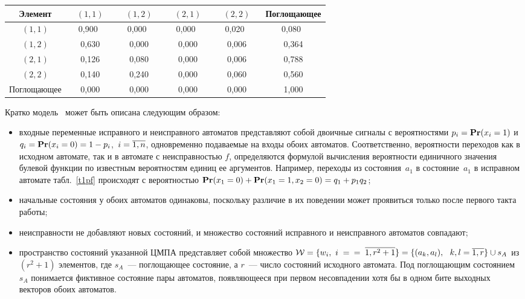 \begin{multicols}{2}
\begin{table*}[b]\small %
\begin{center}
\vspace*{2ex}

\begin{tabular}{|c||c|c|c|c|c|}
\hline
Элемент& $(1,1)$ & $(1,2)$ & $(2,1)$ & $(2,2)$ & Поглощающее \\
\hline
$(1,1)$ &\ \ 0,900\ \ \ &\ \ 0,000\ \ \ &\ \ 0,000\ \ \ &\ \ 0,020\ \ \ &\ \
0,080\ \ \ \\
$(1,2)$ & 0,630 & 0,000 & 0,000 & 0,006 & 0,364 \\
$(2,1)$ & 0,126 & 0,080 & 0,000 & 0,006 & 0,788 \\
$(2,2)$ & 0,140 & 0,240 & 0,000 & 0,060 & 0,560 \\
Поглощающее & 0,000 & 0,000 & 0,000 & 0,000 & 1,000 \\
\hline
\end{tabular}
\end{center}
\end{table*}

Кратко модель~\cite{4} может быть описана сле\-ду\-ющим образом:
\begin{itemize}
\item
 входные переменные исправного и неисправного автоматов представляют
собой двоичные сигналы с вероятностями
$p_i = {\bf Pr}(x_i=1)$ и $q_i = {\bf Pr}(x_i=0) = 1-p_i$,\ $i = \overline{1,n}$,
одновременно подаваемые на входы обоих автоматов.
Соответственно, вероятности переходов как в исходном автомате, так и в
автомате с неисправностью $f$, определяются формулой вы\-чис\-ле\-ния вероятности
единичного значения булевой функции по известным вероятностям единиц ее
аргументов.
Например, переходы из со\-сто\-яния~$a_1$ в со\-сто\-яние~$a_1$ в исправном автомате
табл.~\ref{t1pf} происходят с вероятностью
${\bf Pr}(x_1=0)+{\bf Pr}(x_1=1,x_2=0) = q_1+p_1 q_2$;
\item
 начальные состояния у обоих автоматов одинаковы, поскольку различие
в их поведении может проявиться только после первого такта работы;
\item
 неисправности не добавляют новых состояний, и множество состояний
исправного и неисправного автоматов совпадают;
\item
 пространство состояний указанной ЦМПА представляет собой множество
${\cal W} = \{w_i,\ i\;=$\linebreak
$=\;\o{1,r^2+1}\} = \{(a_k,a_l),\ \ k,l=\o{1,r}\}\cup s_A$
из $(r^2 + 1)$ элементов, где $s_A$~--- поглощающее состояние, а $r$~---
число состояний исходного автомата.
Под поглощающим со\-сто\-яни\-ем~$s_A$ понимается фиктивное состояние пары
автоматов, появляющееся при первом несовпадении хотя бы в одном бите
выходных векторов обоих автоматов.
\end{itemize}


\end{multicols}
